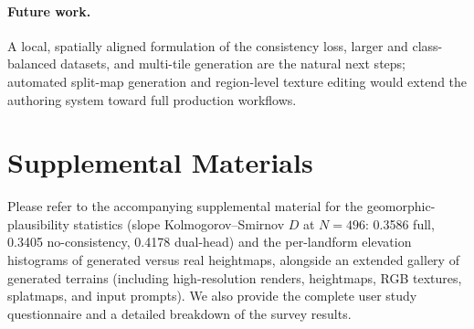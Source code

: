 \documentclass[review]{vgtc}                 %
\begin{document}
\paragraph{Future work.}
A local, spatially aligned formulation of the consistency loss, larger and class-balanced datasets, and multi-tile generation are the natural next steps; automated split-map generation and region-level texture editing would extend the authoring system toward full production workflows. 
\section*{Supplemental Materials}
\label{sec:supplemental_materials}

\begin{table}[t]
    \centering
    \caption{Quantitative evaluation of generated terrains scored by Qwen3.5-7B~\cite{qwen3.5}. Evaluations reveal that our generated terrains attain scores highly consistent with those of real terrain images, demonstrating a minimal domain gap. }
    \label{tab:llm_evaluation}
\end{table}


Please refer to the accompanying supplemental material for the geomorphic-plausibility statistics (slope Kolmogorov--Smirnov $D$ at $N{=}496$: 0.3586 full, 0.3405 no-consistency, 0.4178 dual-head) and the per-landform elevation histograms of generated versus real heightmaps, alongside an extended gallery of generated terrains (including high-resolution renders, heightmaps, RGB textures, splatmaps, and input prompts). We also provide the complete user study questionnaire and a detailed breakdown of the survey results. 


%

%
%
%


\end{document}
